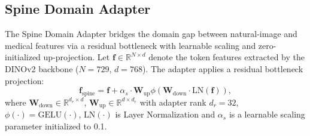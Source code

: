 \documentclass[journal]{IEEEtran}
\begin{document}
\subsection{Spine Domain Adapter}
\label{sec:spine_adapter}
The Spine Domain Adapter bridges the domain gap between natural-image and medical features via a residual bottleneck with learnable scaling and zero-initialized up-projection. Let $\mathbf{f} \in \mathbb{R}^{N \times d}$ denote the token features extracted by the DINOv2 backbone ($N=729$, $d=768$).
The adapter applies a residual bottleneck projection:
\begin{equation}
    \mathbf{f}_{\text{spine}} = \mathbf{f} + \alpha_s \cdot \mathbf{W}_{\text{up}}   \phi\!\left(\mathbf{W}_{\text{down}} \cdot \text{LN}\!\left(\mathbf{f}\right)\right),
    \label{eq:sda}
\end{equation}
where $\mathbf{W}_{\text{down}} \!\in\! \mathbb{R}^{d_r \times d}$, $\mathbf{W}_{\text{up}} \!\in\! \mathbb{R}^{d \times d_r}$ with adapter rank $d_r=32$, $\phi(\cdot) = \text{GELU}(\cdot)$, $\text{LN}(\cdot)$ is Layer Normalization and $\alpha_s$ is a learnable scaling parameter initialized to 0.1.
\end{document}

